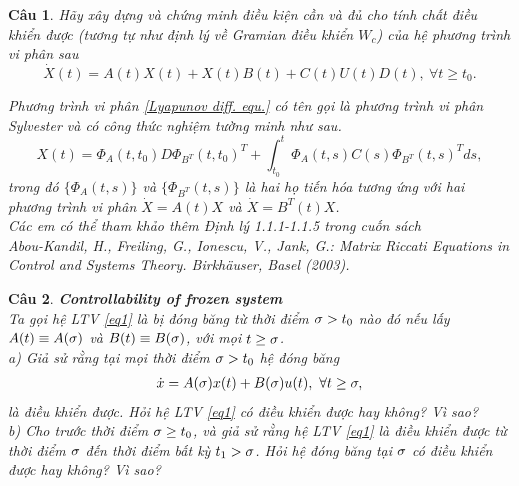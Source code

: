 \documentclass[11pt]{article}
\newtheorem{bt}{Câu}
\begin{document}
\begin{bt}
	Hãy xây dựng và chứng minh điều kiện cần và đủ cho tính chất điều khiển được (tương tự như định lý về Gramian điều khiển $W_c$) của hệ phương trình vi phân sau
	\begin{equation}\label{Lyapunov diff. equ.}
		\dot{X}(t) = A(t)X(t) + X(t)B(t) + C(t)U(t)D(t), \ \forall t\geq t_0.
	\end{equation}
%
\begin{tcolorbox}[colback=yellow!5!white,colframe=blue!75!black]
Phương trình vi phân \eqref{Lyapunov diff. equ.} có tên gọi là phương trình vi phân Sylvester và có công thức nghiệm tường minh như sau.
%
\begin{equation}
	X(t) = \Phi_A(t,t_0) D \Phi_{B^T}(t,t_0)^T + \int_{t_0}^t \Phi_A(t,s) C(s) \Phi_{B^T}(t,s)^T ds,
\end{equation}
%
trong đó $\{\Phi_A(t,s)\}$ và $\{\Phi_{B^T}(t,s)\}$ là hai họ tiến hóa tương ứng với hai phương trình vi phân
$\dot{X} = A(t)X$ và $\dot{X} = B^T(t)X$. \\

Các em có thể tham khảo thêm Định lý 1.1.1-1.1.5 trong cuốn sách \\
\emph{Abou-Kandil, H., Freiling, G., Ionescu, V., Jank, G.: Matrix Riccati Equations in Control and Systems Theory. Birkhäuser, Basel (2003)}. 
\end{tcolorbox}
\end{bt}

\begin{bt} \textbf{Controllability of frozen system} \\ 
	Ta gọi hệ LTV \eqref{eq1} là bị đóng băng từ thời điểm $\sigma > t_0$ nào đó nếu lấy $A(t) \equiv A(\sigma)$ và $B(t) \equiv B(\sigma)$, với mọi $t \geq \sigma$.\\  	
	a) Giả sử rằng tại mọi thời điểm $\sigma > t_0$ hệ đóng băng 
	\begin{align*}
		\dot{x} = A(\sigma) x(t) + B(\sigma) u(t), \ \forall t\geq \sigma,
	\end{align*}%
	là điều khiển được. Hỏi hệ LTV \eqref{eq1} có điều khiển được hay không? Vì sao? \\
	b) Cho trước thời điểm $\sigma \geq t_0$, và giả sử rằng hệ LTV \eqref{eq1} là điều khiển được từ thời điểm $\sigma$ đến thời điểm bất kỳ $t_1 > \sigma$. Hỏi hệ đóng băng tại $\sigma$ có điều khiển được hay không? Vì sao?
\end{bt}
	
\end{document}
